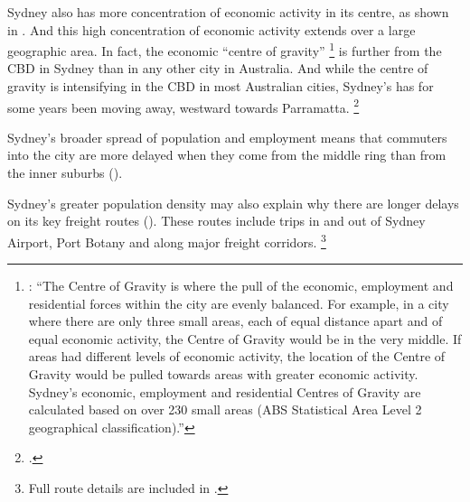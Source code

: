 \documentclass{grattan}
\begin{document}
Sydney also has more concentration of economic activity in its centre, as shown in . And this high concentration of economic activity extends over a large geographic area. In fact, the economic ``centre of gravity''%
    \footnote{\textcite[][8]{PWC-Committee-for-Sydney-centres-of-gravity-for-emp-and-pop}: ``The Centre of Gravity is where the pull of the economic, employment and residential forces within the city are evenly balanced.
    For example, in a city where there are only three small areas, each of equal distance apart and of equal economic activity, the Centre of Gravity would be in the very middle.
    If areas had different levels of economic activity, the location of the Centre of Gravity would be pulled towards areas with greater economic activity.
Sydney's economic, employment and residential Centres of Gravity are calculated based on over 230 small areas (ABS Statistical Area Level 2 geographical classification).''}
is further from the CBD in Sydney than in any other city in Australia. And while the centre of gravity is intensifying in the CBD in most Australian cities, Sydney's has for some years been moving away, westward towards Parramatta.%
    \footcite[][3]{PWC-Committee-for-Sydney-centres-of-gravity-for-emp-and-pop}

Sydney's broader spread of population and employment means that commuters into the city are more delayed when they come from the middle ring than from the inner suburbs (). 

Sydney's greater population density may also explain why there are longer delays on its key freight routes (). These routes include trips in and out of Sydney Airport, Port Botany and along major freight corridors.%
    \footnote{Full route details are included in .}
\end{document}
